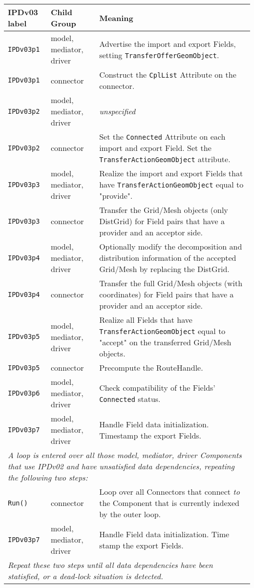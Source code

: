 \vspace*{3ex}
\begin{tabular}[h]{|p{35mm}|p{4cm}|p{6cm}|}
     \hline\hline
     {\bf IPDv03 label} & {\bf Child Group} & {\bf Meaning}\\
     \hline\hline
     {\tt IPDv03p1} & model, mediator, driver & Advertise the import and export Fields, setting {\tt TransferOfferGeomObject}.\\ \hline
     {\tt IPDv03p1} & connector               & Construct the {\tt CplList} Attribute on the connector.\\ \hline
     {\tt IPDv03p2} & model, mediator, driver & {\em unspecified}\\ \hline
     {\tt IPDv03p2} & connector               & Set the {\tt Connected} Attribute on each import and export Field. Set the {\tt TransferActionGeomObject} attribute.\\ \hline
     {\tt IPDv03p3} & model, mediator, driver & Realize the import and export Fields that have {\tt TransferActionGeomObject} equal to "provide".\\ \hline
     {\tt IPDv03p3} & connector               & Transfer the Grid/Mesh objects (only DistGrid) for Field pairs that have a provider and an acceptor side.\\ \hline
     {\tt IPDv03p4} & model, mediator, driver & Optionally modify the decomposition and distribution information of the accepted Grid/Mesh by replacing the DistGrid.\\ \hline
     {\tt IPDv03p4} & connector               & Transfer the full Grid/Mesh objects (with coordinates) for Field pairs that have a provider and an acceptor side.\\ \hline
     {\tt IPDv03p5} & model, mediator, driver & Realize all Fields that have {\tt TransferActionGeomObject} equal to "accept" on the transferred Grid/Mesh objects.\\ \hline
     {\tt IPDv03p5} & connector               & Precompute the RouteHandle.\\ \hline
     {\tt IPDv03p6} & model, mediator, driver & Check compatibility of the Fields' {\tt Connected} status.\\ \hline
     {\tt IPDv03p7} & model, mediator, driver & Handle Field data initialization. Timestamp the export Fields.\\ \hline
     \multicolumn{3}{|p{13.5cm}|}{\it A loop is entered over all those model, mediator, driver Components that use IPDv02 and have
     unsatisfied data dependencies, repeating the following two steps:}\\ \hline
     {\tt Run()}    & connector               & Loop over all Connectors that connect {\it to} the Component that is currently indexed by the outer loop.\\ \hline
     {\tt IPDv03p7} & model, mediator, driver & Handle Field data initialization. Time stamp the export Fields.\\ \hline
     \multicolumn{3}{|p{13.5cm}|}{\it Repeat these two steps until all data
     dependencies have been statisfied, or a dead-lock situation is detected.}\\ 
     \hline\hline
\end{tabular}\newline
